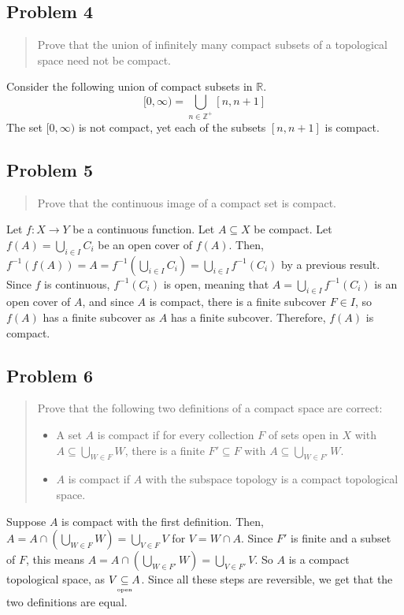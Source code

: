 \documentclass[8pt]{extarticle}
\newcommand{\open}{\underset{\clap{\tiny open}}{\subseteq}}
\begin{document}
{\subsection*{Problem 4}
\begin{quote}
	Prove that the union of infinitely many compact subsets of a topological space need not be compact.
\end{quote}
Consider the following union of compact subsets in $\mathbb{R}$.
\[
[0,\infty) = \bigcup_{n\in\mathbb{Z}^{+}} [n,n+1]
\]
The set $[0,\infty)$ is not compact, yet each of the subsets $[n,n+1]$ is compact.
\subsection*{Problem 5}
\begin{quote}
	Prove that the continuous image of a compact set is compact.
\end{quote}
Let $f:X\rightarrow Y$ be a continuous function. Let $A\subseteq X$ be compact. Let $f(A) = \bigcup_{i\in I} C_{i}$ be an open cover of $f(A)$. Then, $f^{-1}(f(A)) = A = f^{-1}\left(\bigcup_{i\in I}C_{i}\right) = \bigcup_{i\in I}f^{-1}(C_{i})$ by a previous result. Since $f$ is continuous, $f^{-1}(C_{i})$ is open, meaning that $A = \bigcup_{i\in I}f^{-1}(C_{i})$ is an open cover of $A$, and since $A$ is compact, there is a finite subcover $F\in I$, so $f(A)$ has a finite subcover as $A$ has a finite subcover. Therefore, $f(A)$ is compact.
\subsection*{Problem 6}
\begin{quote}
	Prove that the following two definitions of a compact space are correct:
	\begin{itemize}
		\item A set $A$ is compact if for every collection $F$ of sets open in $X$ with $A\subseteq \bigcup_{W\in F}W$, there is a finite $F'\subseteq F$ with $A\subseteq\bigcup_{W\in F'} W$.
		\item $A$ is compact if $A$ with the subspace topology is a compact topological space.
	\end{itemize}
\end{quote}
Suppose $A$ is compact with the first definition. Then, $A = A\cap \left(\bigcup_{W\in F} W\right) = \bigcup_{V\in F} V$ for $V = W\cap A$. Since $F'$ is finite and a subset of $F$, this means $A = A\cap \left(\bigcup_{W\in F'} W\right) = \bigcup_{V\in F'} V$. So $A$ is a compact topological space, as $V\open A$. Since all these steps are reversible, we get that the two definitions are equal.
\pagebreak
}
\end{document}
